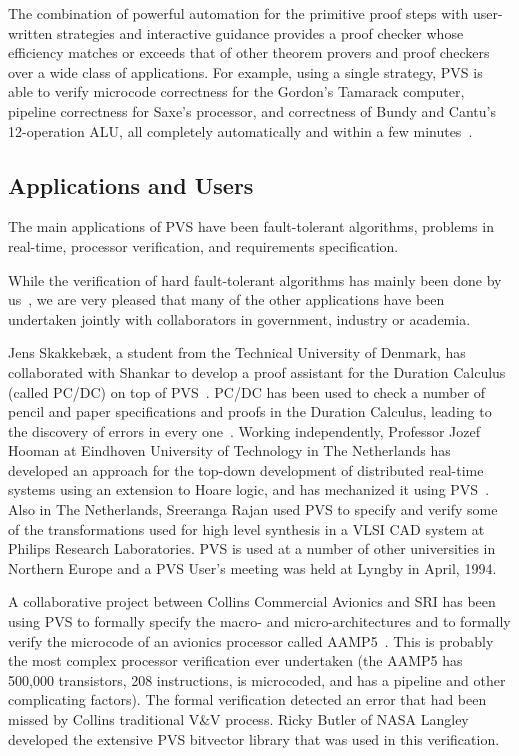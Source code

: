 The combination of powerful automation for the primitive proof steps
with user-written strategies and interactive guidance provides a proof
checker whose efficiency matches or exceeds that of other theorem
provers and proof checkers over a wide class of applications.  For
example, using a single strategy, PVS is able to verify microcode
correctness for the Gordon's Tamarack computer, pipeline correctness
for Saxe's processor, and correctness of Bundy and Cantu's
12-operation ALU, all completely automatically and within a few
minutes~\cite{Cyrluk94:TPCD}.

\subsection{Applications and Users}

The main applications of PVS have been fault-tolerant algorithms,
problems in real-time, processor verification, and requirements
specification.

While the verification of hard fault-tolerant algorithms has mainly
been done by
us~\cite{Lincoln&Rushby93:CAV,Lincoln&Rushby93:FTCS,Lincoln&Rushby94:FTP,Owre-etal:FME93,Rushby94:icah},
we are very pleased that many of the other applications have been
undertaken jointly with collaborators in government, industry or
academia.

Jens Skakkeb{\ae}k, a student from the Technical University of
Denmark, has collaborated with Shankar to develop a proof assistant
for the Duration Calculus (called PC/DC) on top of
PVS~\cite{Skakkebaek&Shankar94}.  PC/DC has been used to check a
number of pencil and paper specifications and proofs in the Duration
Calculus, leading to the discovery of errors in every
one~\cite{Inal&Jens94}.  Working independently, Professor Jozef Hooman
at Eindhoven University of Technology in The Netherlands has developed
an approach for the top-down development of distributed real-time
systems using an extension to Hoare logic, and has mechanized it using
PVS~\cite{Hooman94}.  Also in The Netherlands, Sreeranga Rajan used
PVS to specify and verify some of the transformations used for high
level synthesis in a VLSI CAD system at Philips Research Laboratories.
PVS is used at a number of other universities in Northern Europe and a
PVS User's meeting was held at Lyngby in April, 1994.

A collaborative project between Collins Commercial Avionics and SRI
has been using PVS to formally specify the macro- and
micro-architectures and to formally verify the microcode of an
avionics processor called AAMP5~\cite{Miller&Srivas95}.  This is
probably the most complex processor verification ever undertaken (the
AAMP5 has 500,000 transistors, 208 instructions, is microcoded, and
has a pipeline and other complicating factors).  The formal
verification detected an error that had been missed by Collins
traditional V\&V process.  Ricky Butler of NASA Langley developed the
extensive PVS bitvector library that was used in this verification.


